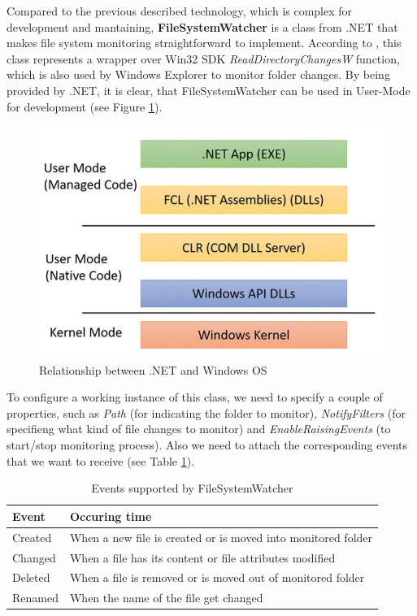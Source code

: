 Compared to the previous described technology, which is complex for development and mantaining, \textbf{FileSystemWatcher} is a class from .NET that makes file system monitoring straightforward to implement. According to \cite{dotNetFramework}, this class represents a wrapper over Win32 SDK \textit{ReadDirectoryChangesW} function, which is also used by Windows Explorer to monitor folder changes. By being provided by .NET, it is clear, that FileSystemWatcher can be used in User-Mode for development (see Figure \ref{netFramework}). 

\begin{figure}[H]
	\centerline{\includegraphics[scale=0.5]{figures/NetFramework.png}}  
	\caption{Relationship between .NET and Windows OS \cite{winInternals}}
	\label{netFramework}
\end{figure}

To configure a working instance of this class, we need to specify a couple of properties, such as \textit{Path} (for indicating the folder to monitor), \textit{NotifyFilters} (for specifieng what kind of file changes to monitor) and \textit{EnableRaisingEvents} (to start/stop monitoring process). Also we need to attach the corresponding events that we want to receive (see Table \ref{table:supportedEvents}).

\begin{table}[H]
	\caption{Events supported by FileSystemWatcher}
	\label{table:supportedEvents}
		\centering
            \begin{tabular}{l | l}
                
				\textbf{Event} & \textbf{Occuring time} \\
				\hline 
 				Created & When a new file is created or is moved into monitored folder \\
 				Changed & When a file has its content or file attributes modified \\
 				Deleted & When a file is removed or is moved out of monitored folder \\
                Renamed & When the name of the file get changed\\
                 
			\end{tabular}
\end{table}

